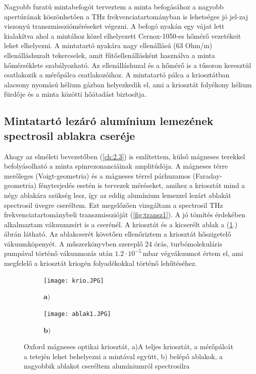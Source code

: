 \documentclass[a4paper,12pt]{article}
\numberwithin{equation}{section}
\begin{document}
Nagyobb furatú mintabefogót terveztem a minta befogásához a nagyobb apertúrának köszönhetően a THz frekvenciatartományban is lehetséges jó jel-zaj viszonyú transzmisszióméréseket végezni. A befogó nyakán egy vájat lett kialakítva ahol a mintához közel elhelyezett Cernox-1050-es hőmérő vezetékeit lehet elhelyezni. A mintatartó nyakára nagy ellenállású (63 Ohm/m) ellenálláshuzalt tekercselek, amit fűtőellenállásként használva a minta hőmérséklete szabályozható. Az ellenálláshuzal és a hőmérő is a tűsoron keresztül csatlakozik a mérőpálca csatlakozóihoz. A mintatartó pálca a kriosztátban alacsony nyomású hélium gázban helyezkedik el, ami a kriosztát folyékony hélium fürdője és a minta közötti hőátadást biztosítja.

\subsection{Mintatartó lezáró alumínium lemezének spectrosil ablakra cseréje}

Ahogy az elméleti bevezetőben (\ref{ch:2.3}) is említettem, külső mágneses terekkel befolyásolható a minta spinrezonanciáinak amplitúdója. A mágneses térre merőleges (Voigt-geometria) és a mágneses térrel párhuzamos (Faraday-geometria) fényterjedés esetén is tervezek méréseket, amihez a kriosztát mind a négy ablakára szükség lesz, így az eddig alumínium lemezzel lezárt ablakát spectrosil üvegre cseréltem. Ezt megelőzően vizsgáltam a spectrosil THz frekvenciatartománybeli transzmisszióját (\ref{fig:transz1}). A jó tömítés érdekében alkalmaztam vákuumzsírt is a cserénél. A kriosztát és a kicserélt ablak a (\ref{fig:krio}.) ábrán látható. Az ablakcserét követően ellenőriztem a kriosztát hőszigetelő vákuumköpenyét. A műszerkönyvben szereplő 24 órás, turbómolekuláris pumpával történő vákuumozás után $1.2 \cdot 10^{-5}$\,mbar végvákuumot értem el, ami megfelelő a kriosztát kriogén folyadékokkal történő lehűtéséhez.

\begin{figure}[H]
  \centering

  \begin{subfigure}[b]{0.25\textwidth}
    \caption*{$\bm{a)}$}
    \centering
    \texttt{[image: krio.JPG]}
  \end{subfigure}
  \hfill
  \begin{subfigure}[b]{0.71\textwidth}
  \caption*{$\bm{b)}$}
    \centering
    \texttt{[image: ablak1.JPG]}
  \end{subfigure}
  
  \vspace{-4pt} %
  
  
  \caption{Oxford mágneses optikai kriosztát, a)A teljes kriosztát, a mérőpálcát a tetején lehet behelyezni a mintával együtt, b) belépő ablakok, a nagyobbik ablakot cseréltem alumíniumról spectrosilra}
  \label{fig:krio}
\end{figure}
\end{document}
